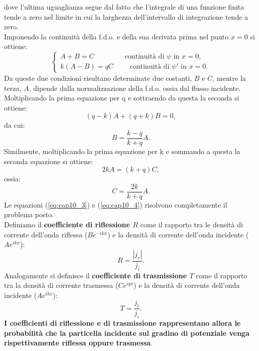 \documentclass[a4paper,11pt,oneside]{book}
\begin{document}
dove l'ultima uguaglianza segue dal fatto che l'integrale di una funzione finita tende a zero nel limite in cui la larghezza dell'intervallo di integrazione tende a zero.\\
Imponendo la continuità della f.d.o. e della sua derivata prima nel punto $x=0$ si ottiene:
\begin{equation}
\begin{cases}
A+B=C \quad \qquad \quad \textrm{ continuità di }\psi\textrm{ in }x=0,\\
k\left(A-B \right) =qC\qquad \textrm{ continuità di }\psi '\textrm{ in }x=0.
\end{cases}
\end{equation}
Da queste due condizioni risultano determinate due costanti, $B$ e $C$, mentre la terza, $A$, dipende dalla normalizzazione della f.d.o. ossia dal flusso incidente.\\
Moltiplicando la prima equazione per q e sottraendo da questa la seconda si ottiene:
\begin{equation}
\left( q-k \right) A + \left( q+k \right)B=0,
\end{equation}
da cui:
\begin{equation}
B= \frac{k-q}{k+q}A.
\label{eq:cap10_3}
\end{equation}
Similmente, moltiplicando la prima equazione per k e sommando a questa la seconda equazione si ottiene:
\begin{equation}
2kA=\left( k+q \right)C,
\end{equation}
ossia:
\begin{equation}
C=\frac{2k}{k+q}A.
\label{eq:cap10_4}
\end{equation}
Le equazioni (\ref{eq:cap10_3}) e (\ref{eq:cap10_4}) risolvono completamente il problema posto.\\
Definiamo il \textbf{coefficiente di riflessione $R$} come il rapporto tra le densità di corrente dell'onda riflessa ($\displaystyle{Be^{-ikx}}$) e la densità di corrente dell'onda incidente ($\displaystyle{Ae^{ikx}}$):
\begin{equation}
R=\frac{|j_r|}{j_i}.
\end{equation}
Analogamente si definisce il \textbf{coefficiente di trasmissione $T$} come il rapporto tra la densità di corrente trasmessa ($\displaystyle{Ce^{iqx}}$) e la densità di corrente dell'onda incidente ($\displaystyle{Ae^{ikx}}$):
\begin{equation}
T=\frac{j_t}{j_i}.
\end{equation}
\textbf{I coefficienti di riflessione e di trasmissione rappresentano allora le probabilità che la particella incidente sul gradino di potenziale venga rispettivamente riflessa oppure trasmessa}.\\
\end{document}
